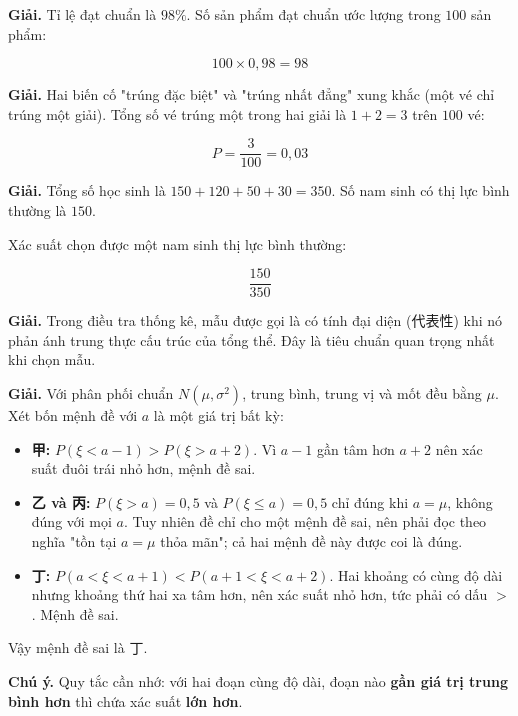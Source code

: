 \documentclass[11pt, a4paper]{article}
\begin{document}
\begin{dapan}[11 — Đáp án C]
\textbf{Giải.} Tỉ lệ đạt chuẩn là $98\%$. Số sản phẩm đạt chuẩn ước lượng trong $100$ sản phẩm:

$$100 \times 0{,}98 = 98$$
\end{dapan}

\begin{dapan}[12 — Đáp án C]
\textbf{Giải.} Hai biến cố "trúng đặc biệt" và "trúng nhất đẳng" xung khắc (một vé chỉ trúng một giải). Tổng số vé trúng một trong hai giải là $1 + 2 = 3$ trên $100$ vé:

$$P = \frac{3}{100} = 0{,}03$$
\end{dapan}

\begin{dapan}[13 — Đáp án D]
\textbf{Giải.} Tổng số học sinh là $150 + 120 + 50 + 30 = 350$. Số nam sinh có thị lực bình thường là $150$.

Xác suất chọn được một nam sinh thị lực bình thường:

$$\frac{150}{350}$$
\end{dapan}

\begin{dapan}[14 — Đáp án D]
\textbf{Giải.} Trong điều tra thống kê, mẫu được gọi là có tính đại diện (代表性) khi nó phản ánh trung thực cấu trúc của tổng thể. Đây là tiêu chuẩn quan trọng nhất khi chọn mẫu.
\end{dapan}

\begin{dapan}[15 — Đáp án D]
\textbf{Giải.} Với phân phối chuẩn $N(\mu, \sigma^2)$, trung bình, trung vị và mốt đều bằng $\mu$. Xét bốn mệnh đề với $a$ là một giá trị bất kỳ:

\begin{itemize}[leftmargin=1.4em, itemsep=2pt]
\item \textbf{甲:} $P(\xi < a - 1) > P(\xi > a + 2)$. Vì $a - 1$ gần tâm hơn $a + 2$ nên xác suất đuôi trái nhỏ hơn, mệnh đề sai.
\item \textbf{乙 và 丙:} $P(\xi > a) = 0{,}5$ và $P(\xi \le a) = 0{,}5$ chỉ đúng khi $a = \mu$, không đúng với mọi $a$. Tuy nhiên đề chỉ cho một mệnh đề sai, nên phải đọc theo nghĩa "tồn tại $a = \mu$ thỏa mãn"; cả hai mệnh đề này được coi là đúng.
\item \textbf{丁:} $P(a < \xi < a + 1) < P(a + 1 < \xi < a + 2)$. Hai khoảng có cùng độ dài nhưng khoảng thứ hai xa tâm hơn, nên xác suất nhỏ hơn, tức phải có dấu $>$. Mệnh đề sai.
\end{itemize}


Vậy mệnh đề sai là 丁.

\textbf{Chú ý.} Quy tắc cần nhớ: với hai đoạn cùng độ dài, đoạn nào \textbf{gần giá trị trung bình hơn} thì chứa xác suất \textbf{lớn hơn}.
\end{dapan}
\end{document}
